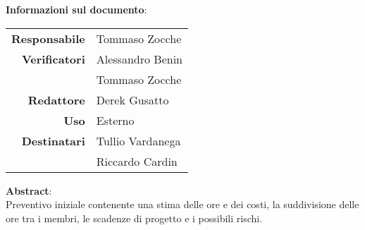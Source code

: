 \begin{center}
\textbf{Informazioni sul documento}: \\
\vspace{0.5cm}

\begin{tabular}{r|l}
    \textbf{Responsabile} &  Tommaso Zocche\\ 
    \textbf{Verificatori} &  Alessandro Benin\\ & Tommaso Zocche\\
    \textbf{Redattore} &     Derek Gusatto\\ 
    \textbf{Uso} & Esterno \\ 
    \textbf{Destinatari} & Tullio Vardanega \\ & Riccardo Cardin \\ 
\end{tabular}

\vfill

\textbf{Abstract}: \\
\vspace{0.5cm}
Preventivo iniziale contenente una stima delle ore e dei costi, la suddivisione delle ore tra i membri, le scadenze di progetto e i possibili rischi.
\end{center}


\bigskip